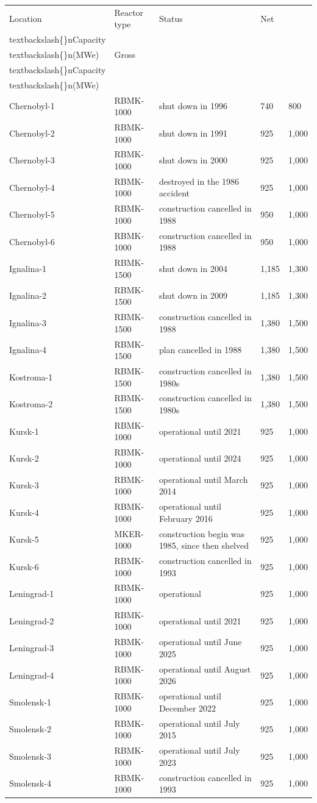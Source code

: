 \documentclass{article}
\begin{document}
\begin{tabular}{lllll}
\toprule
Location & Reactor type & Status & Net\\textbackslash\{\}nCapacity\\textbackslash\{\}n(MWe) & Gross\\textbackslash\{\}nCapacity\\textbackslash\{\}n(MWe) \\
\midrule
Chernobyl-1 & RBMK-1000 & shut down in 1996 & 740 & 800 \\
Chernobyl-2 & RBMK-1000 & shut down in 1991 & 925 & 1,000 \\
Chernobyl-3 & RBMK-1000 & shut down in 2000 & 925 & 1,000 \\
Chernobyl-4 & RBMK-1000 & destroyed in the 1986 accident & 925 & 1,000 \\
Chernobyl-5 & RBMK-1000 & construction cancelled in 1988 & 950 & 1,000 \\
Chernobyl-6 & RBMK-1000 & construction cancelled in 1988 & 950 & 1,000 \\
Ignalina-1 & RBMK-1500 & shut down in 2004 & 1,185 & 1,300 \\
Ignalina-2 & RBMK-1500 & shut down in 2009 & 1,185 & 1,300 \\
Ignalina-3 & RBMK-1500 & construction cancelled in 1988 & 1,380 & 1,500 \\
Ignalina-4 & RBMK-1500 & plan cancelled in 1988 & 1,380 & 1,500 \\
Kostroma-1 & RBMK-1500 & construction cancelled in 1980s & 1,380 & 1,500 \\
Kostroma-2 & RBMK-1500 & construction cancelled in 1980s & 1,380 & 1,500 \\
Kursk-1 & RBMK-1000 & operational until 2021 & 925 & 1,000 \\
Kursk-2 & RBMK-1000 & operational until 2024 & 925 & 1,000 \\
Kursk-3 & RBMK-1000 & operational until March 2014 & 925 & 1,000 \\
Kursk-4 & RBMK-1000 & operational until February 2016 & 925 & 1,000 \\
Kursk-5 & MKER-1000 & construction begin was 1985, since then shelved & 925 & 1,000 \\
Kursk-6 & RBMK-1000 & construction cancelled in 1993 & 925 & 1,000 \\
Leningrad-1 & RBMK-1000 & operational & 925 & 1,000 \\
Leningrad-2 & RBMK-1000 & operational until 2021 & 925 & 1,000 \\
Leningrad-3 & RBMK-1000 & operational until June 2025 & 925 & 1,000 \\
Leningrad-4 & RBMK-1000 & operational until August 2026 & 925 & 1,000 \\
Smolensk-1 & RBMK-1000 & operational until December 2022 & 925 & 1,000 \\
Smolensk-2 & RBMK-1000 & operational until July 2015 & 925 & 1,000 \\
Smolensk-3 & RBMK-1000 & operational until July 2023 & 925 & 1,000 \\
Smolensk-4 & RBMK-1000 & construction cancelled in 1993 & 925 & 1,000 \\
\bottomrule
\end{tabular}
\end{document}
